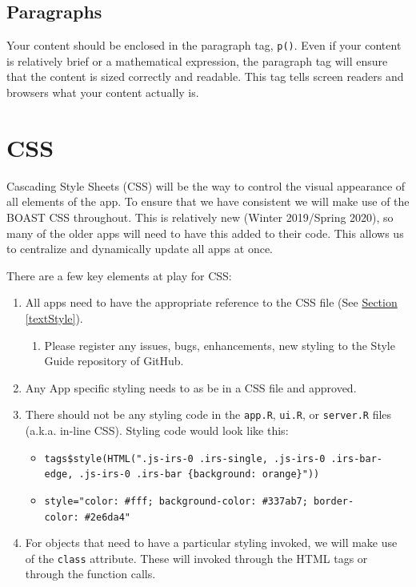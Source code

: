 \documentclass[
]{book}
\providecommand{\tightlist}{%
  \setlength{\itemsep}{0pt}\setlength{\parskip}{0pt}}
\begin{document}
\hypertarget{paragraphsc}{%
\subsection{Paragraphs}\label{paragraphsc}}

Your content should be enclosed in the paragraph tag, \texttt{p()}. Even if your content is relatively brief or a mathematical expression, the paragraph tag will ensure that the content is sized correctly and readable. This tag tells screen readers and browsers what your content actually is.

\hypertarget{cssc}{%
\section{CSS}\label{cssc}}

Cascading Style Sheets (CSS) will be the way to control the visual appearance of all elements of the app. To ensure that we have consistent we will make use of the BOAST CSS throughout. This is relatively new (Winter 2019/Spring 2020), so many of the older apps will need to have this added to their code. This allows us to centralize and dynamically update all apps at once.

There are a few key elements at play for CSS:

\begin{enumerate}
\def\labelenumi{\arabic{enumi}.}
\tightlist
\item
  All apps need to have the appropriate reference to the CSS file (See \protect\hyperlink{textStylec}{Section \ref{textStyle}}).

  \begin{enumerate}
  \def\labelenumii{\alph{enumii}.}
  \tightlist
  \item
    Please register any issues, bugs, enhancements, new styling to the Style Guide repository of GitHub.
  \end{enumerate}
\item
  Any App specific styling needs to as be in a CSS file and approved.
\item
  There should not be any styling code in the \texttt{app.R}, \texttt{ui.R}, or \texttt{server.R} files (a.k.a. in-line CSS). Styling code would look like this:

  \begin{itemize}
  \tightlist
  \item
    \texttt{tags\$style(HTML(".js-irs-0\ .irs-single,\ .js-irs-0\ .irs-bar-edge,\ .js-irs-0\ .irs-bar\ \{background:\ orange\}"))}~\\
  \item
    \texttt{style="color:\ \#fff;\ background-color:\ \#337ab7;\ border-color:\ \#2e6da4"}
  \end{itemize}
\item
  For objects that need to have a particular styling invoked, we will make use of the \texttt{class} attribute. These will invoked through the HTML tags or through the function calls.
\end{enumerate}
\end{document}
